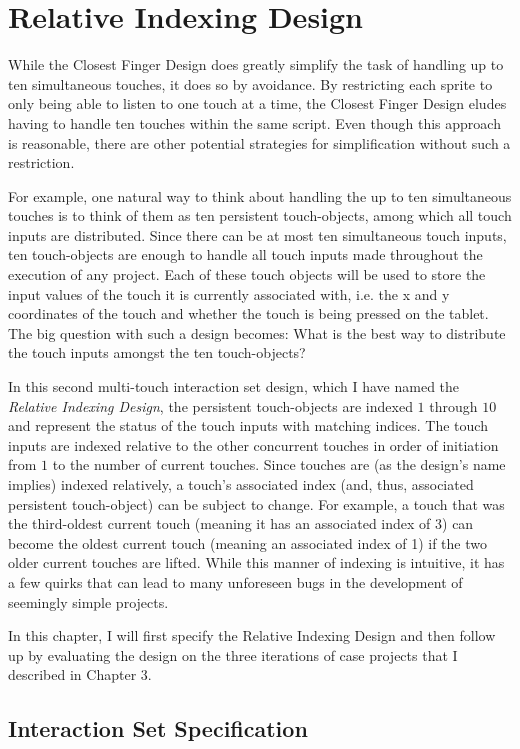 \chapter{Relative Indexing Design}
While the Closest Finger Design does greatly simplify the task of handling up to ten simultaneous touches, it does so by avoidance. By restricting each sprite to only being able to listen to one touch at a time, the Closest Finger Design eludes having to handle ten touches within the same script. Even though this approach is reasonable, there are other potential strategies for simplification without such a restriction.

For example, one natural way to think about handling the up to ten simultaneous touches is to think of them as ten persistent touch-objects, among which all touch inputs are distributed. Since there can be at most ten simultaneous touch inputs, ten touch-objects are enough to handle all touch inputs made throughout the execution of any project. Each of these touch objects will be used to store the input values of the touch it is currently associated with, i.e. the x and y coordinates of the touch and whether the touch is being pressed on the tablet. The big question with such a design becomes: What is the best way to distribute the touch inputs amongst the ten touch-objects?

In this second multi-touch interaction set design, which I have named the \emph{Relative Indexing Design}, the persistent touch-objects are indexed $1$ through $10$ and represent the status of the touch inputs with matching indices. The touch inputs are indexed relative to the other concurrent touches in order of initiation from $1$ to the number of current touches. Since touches are (as the design's name implies) indexed relatively, a touch's associated index (and, thus, associated persistent touch-object) can  be subject to change. For example, a touch that was the third-oldest current touch (meaning it has an associated index of 3) can become the oldest current touch (meaning an associated index of 1) if the two older current touches are lifted. While this manner of indexing is intuitive, it has a few quirks that can lead to many unforeseen bugs in the development of seemingly simple projects.

In this chapter, I will first specify the Relative Indexing Design and then follow up by evaluating the design on the three iterations of case projects that I described in Chapter 3.

\section{Interaction Set Specification}

